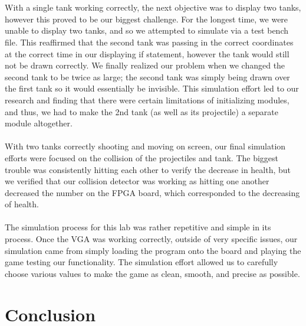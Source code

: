 \documentclass{article}
\begin{document}
\\
\\
With a single tank working correctly, the next objective was to display two tanks, however this proved to be our biggest challenge.  For the longest time, we were unable to display two tanks, and so we attempted to simulate via a test bench file.  This reaffirmed that the second tank was passing in the correct coordinates at the correct time in our displaying if statement, however the tank would still not be drawn correctly.  We finally realized our problem when we changed the second tank to be twice as large; the second tank was simply being drawn over the first tank so it would essentially be invisible.  This simulation effort led to our research and finding that there were certain limitations of initializing modules, and thus, we had to make the 2nd tank (as well as its projectile) a separate module altogether.            
\\
\\
With two tanks correctly shooting and moving on screen, our final simulation efforts were focused on the collision of the projectiles and tank.  The biggest trouble was consistently hitting each other to verify the decrease in health, but we verified that our collision detector was working as hitting one another decreased the number on the FPGA board, which corresponded to the decreasing of health. 
\\
\\
The simulation process for this lab was rather repetitive and simple in its process.  Once the VGA was working correctly, outside of very specific issues, our simulation came from simply loading the program onto the board and playing the game testing our functionality.  The simulation effort allowed us to carefully choose various values to make the game as clean, smooth, and precise as possible. 



\section*{Conclusion}
\end{document}
